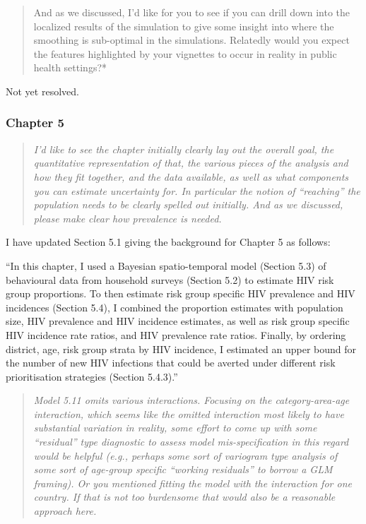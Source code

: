 \documentclass[
  12pt,
]{article}
\begin{document}
\begin{quote}
And as we discussed, I'd like for you to see if you can drill down into
the localized results of the simulation to give some insight into where
the smoothing is sub-optimal in the simulations. Relatedly would you
expect the features highlighted by your vignettes to occur in reality in
public health settings?*
\end{quote}

Not yet resolved.

\subsubsection{Chapter 5}\label{chapter-5}

\begin{quote}
\emph{I'd like to see the chapter initially clearly lay out the overall
goal, the quantitative representation of that, the various pieces of the
analysis and how they fit together, and the data available, as well as
what components you can estimate uncertainty for. In particular the
notion of ``reaching'' the population needs to be clearly spelled out
initially. And as we discussed, please make clear how prevalence is
needed.}
\end{quote}

I have updated Section 5.1 giving the background for Chapter 5 as
follows:

``In this chapter, I used a Bayesian spatio-temporal model (Section 5.3)
of behavioural data from household surveys (Section 5.2) to estimate HIV
risk group proportions. To then estimate risk group specific HIV
prevalence and HIV incidences (Section 5.4), I combined the proportion
estimates with population size, HIV prevalence and HIV incidence
estimates, as well as risk group specific HIV incidence rate ratios, and
HIV prevalence rate ratios. Finally, by ordering district, age, risk
group strata by HIV incidence, I estimated an upper bound for the number
of new HIV infections that could be averted under different risk
prioritisation strategies (Section 5.4.3).''

\begin{quote}
\emph{Model 5.11 omits various interactions. Focusing on the
category-area-age interaction, which seems like the omitted interaction
most likely to have substantial variation in reality, some effort to
come up with some ``residual'' type diagnostic to assess model
mis-specification in this regard would be helpful (e.g., perhaps some
sort of variogram type analysis of some sort of age-group specific
``working residuals'' to borrow a GLM framing). Or you mentioned fitting
the model with the interaction for one country. If that is not too
burdensome that would also be a reasonable approach here.}
\end{quote}
\end{document}
